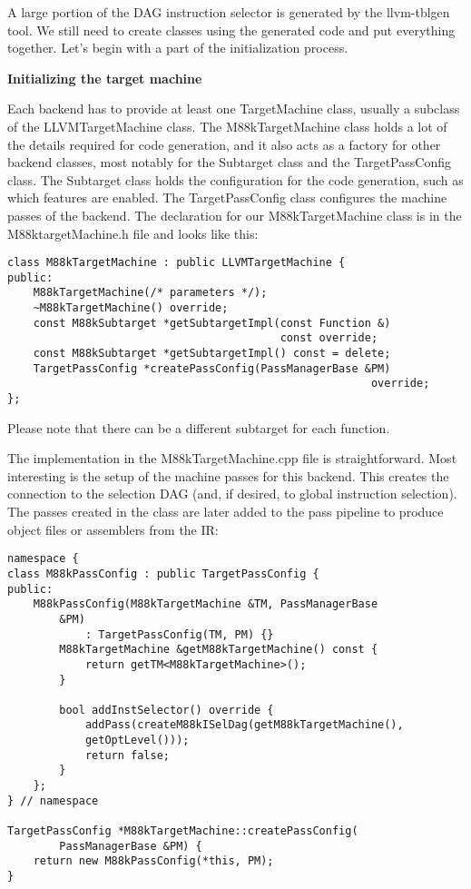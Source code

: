 
A large portion of the DAG instruction selector is generated by the llvm-tblgen tool. We still need to create classes using the generated code and put everything together. Let's begin with a part of the initialization process.\par

\hspace*{\fill} \par %
\textbf{Initializing the target machine}

Each backend has to provide at least one TargetMachine class, usually a subclass of the LLVMTargetMachine class. The M88kTargetMachine class holds a lot of the details required for code generation, and it also acts as a factory for other backend classes, most notably for the Subtarget class and the TargetPassConfig class. The Subtarget class holds the configuration for the code generation, such as which features are enabled. The TargetPassConfig class configures the machine passes of the backend. The declaration for our M88kTargetMachine class is in the M88ktargetMachine.h file and looks like this:\par

\begin{lstlisting}[caption={}]
class M88kTargetMachine : public LLVMTargetMachine {
public:
	M88kTargetMachine(/* parameters */);
	~M88kTargetMachine() override;
	const M88kSubtarget *getSubtargetImpl(const Function &)
										  const override;
	const M88kSubtarget *getSubtargetImpl() const = delete;
	TargetPassConfig *createPassConfig(PassManagerBase &PM)
														override;
};
\end{lstlisting}

Please note that there can be a different subtarget for each function.\par

The implementation in the M88kTargetMachine.cpp file is straightforward. Most interesting is the setup of the machine passes for this backend. This creates the connection to the selection DAG (and, if desired, to global instruction selection). The passes created in the class are later added to the pass pipeline to produce object files or assemblers from the IR:\par

\begin{lstlisting}[caption={}]
namespace {
class M88kPassConfig : public TargetPassConfig {
public:
	M88kPassConfig(M88kTargetMachine &TM, PassManagerBase
		&PM)
			: TargetPassConfig(TM, PM) {}
		M88kTargetMachine &getM88kTargetMachine() const {
			return getTM<M88kTargetMachine>();
		}
	
		bool addInstSelector() override {
			addPass(createM88kISelDag(getM88kTargetMachine(),
			getOptLevel()));
			return false;
		}
	};
} // namespace

TargetPassConfig *M88kTargetMachine::createPassConfig(
		PassManagerBase &PM) {
	return new M88kPassConfig(*this, PM);
}
\end{lstlisting}

